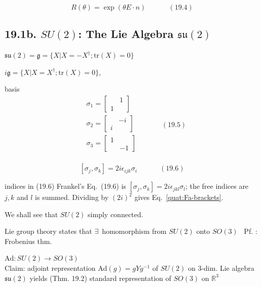 \begin{equation}
R(\theta) = \exp{ (\theta E\cdot n ) } \quad \quad \quad \, (19.4)
\end{equation}



\subsection{19.1b. $SU(2)$: The Lie Algebra $\mathfrak{su}(2)$}

$\mathfrak{su}(2) = \mathfrak{g} = \lbrace X | X = - X^{\dag}; \text{tr}{(X)} = 0\rbrace$

$i\mathfrak{g} = \lbrace X | X = X^{\dag}; \text{tr}{(X)} = 0 \rbrace$, 

basis 
\[
\begin{aligned}
  & \sigma_1 = \left[ \begin{matrix} & 1 \\ 1 &   \end{matrix} \right] \\
  & \sigma_2 = \left[ \begin{matrix} & -i \\ i &   \end{matrix} \right] \\
  & \sigma_3 = \left[ \begin{matrix} 1 &  \\ & -1  \end{matrix} \right] \\
\end{aligned} \quad \quad \quad \, (19.5)
\]

\[
[ \sigma_j , \sigma_k ] = 2i \epsilon_{ijk} \sigma_i \quad \quad \quad \, (19.6)
\]
\begin{correction}{indices in (19.6)}
Frankel's Eq.~(19.6) is $[\sigma_j,\sigma_k]=2i\epsilon_{jkl}\sigma_l$; the free indices are $j,k$ and $l$ is summed. Dividing by $(2i)^2$ gives Eq.~\eqref{quat:Fa-brackets}.
\end{correction}


We shall see that $SU(2)$ simply connected.

Lie group theory states that $\exists \, $ homomorphism from $SU(2)$ onto $SO(3)$ \quad \, Pf. : Frobenius thm.

$\text{Ad}:SU(2) \to SO(3)$ \\
Claim: adjoint representation $\text{Ad}(g) = gYg^{-1}$ of $SU(2)$ on 3-dim. Lie algebra $\mathfrak{su}(2)$ yields (Thm. 19.2) standard representation of $SO(3)$ on $\mathbb{R}^3$

